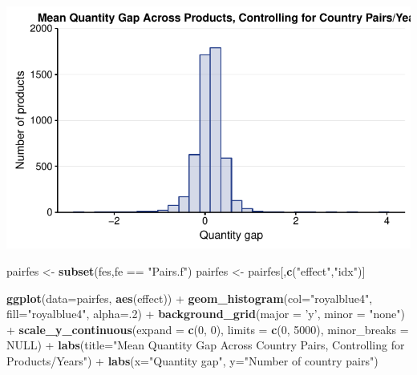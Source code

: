 \documentclass[10pt,]{article}
\newenvironment{Shaded}{\begin{snugshade}}{\end{snugshade}}
\newcommand{\KeywordTok}[1]{\textcolor[rgb]{0.13,0.29,0.53}{\textbf{{#1}}}}
\newcommand{\DataTypeTok}[1]{\textcolor[rgb]{0.13,0.29,0.53}{{#1}}}
\newcommand{\DecValTok}[1]{\textcolor[rgb]{0.00,0.00,0.81}{{#1}}}
\newcommand{\StringTok}[1]{\textcolor[rgb]{0.31,0.60,0.02}{{#1}}}
\newcommand{\OtherTok}[1]{\textcolor[rgb]{0.56,0.35,0.01}{{#1}}}
\newcommand{\NormalTok}[1]{{#1}}
\begin{document}
\begin{center}\includegraphics{Figs/qty_summary-11} \end{center}

\begin{Shaded}
\begin{Highlighting}[]
\NormalTok{pairfes <-}\StringTok{ }\KeywordTok{subset}\NormalTok{(fes,fe ==}\StringTok{ "Pairs.f"}\NormalTok{)}
\NormalTok{pairfes <-}\StringTok{ }\NormalTok{pairfes[,}\KeywordTok{c}\NormalTok{(}\StringTok{"effect"}\NormalTok{,}\StringTok{"idx"}\NormalTok{)]}

\KeywordTok{ggplot}\NormalTok{(}\DataTypeTok{data=}\NormalTok{pairfes, }\KeywordTok{aes}\NormalTok{(effect)) +}
\StringTok{  }\KeywordTok{geom_histogram}\NormalTok{(}\DataTypeTok{col=}\StringTok{"royalblue4"}\NormalTok{,}
                 \DataTypeTok{fill=}\StringTok{"royalblue4"}\NormalTok{,}
                 \DataTypeTok{alpha=}\NormalTok{.}\DecValTok{2}\NormalTok{) +}
\StringTok{  }\KeywordTok{background_grid}\NormalTok{(}\DataTypeTok{major =} \StringTok{'y'}\NormalTok{, }\DataTypeTok{minor =} \StringTok{"none"}\NormalTok{) +}
\StringTok{  }\KeywordTok{scale_y_continuous}\NormalTok{(}\DataTypeTok{expand =} \KeywordTok{c}\NormalTok{(}\DecValTok{0}\NormalTok{, }\DecValTok{0}\NormalTok{), }\DataTypeTok{limits =} \KeywordTok{c}\NormalTok{(}\DecValTok{0}\NormalTok{, }\DecValTok{5000}\NormalTok{), }\DataTypeTok{minor_breaks =} \OtherTok{NULL}\NormalTok{) +}
\StringTok{  }\KeywordTok{labs}\NormalTok{(}\DataTypeTok{title=}\StringTok{"Mean Quantity Gap Across Country Pairs, Controlling for Products/Years"}\NormalTok{) +}
\StringTok{  }\KeywordTok{labs}\NormalTok{(}\DataTypeTok{x=}\StringTok{"Quantity gap"}\NormalTok{, }\DataTypeTok{y=}\StringTok{"Number of country pairs"}\NormalTok{)}
\end{Highlighting}
\end{Shaded}
\end{document}
